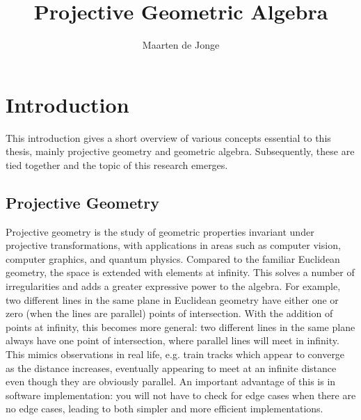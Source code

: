 \documentclass[a4paper, 10pt]{article}
\author{Maarten de Jonge}
\title{Projective Geometric Algebra}
\begin{document}
\newcommand{\rp}{$\mathbb{R}^{3,3}$ }

\maketitle

\section{Introduction}
This introduction gives a short overview of various concepts essential to
this thesis, mainly projective geometry and geometric algebra. Subsequently,
these are tied together and the topic of this research emerges.

\subsection{Projective Geometry}
Projective geometry is the study of geometric properties invariant under
projective transformations, with applications in areas such as computer vision,
computer graphics, and quantum physics. Compared to the familiar Euclidean
geometry, the space is extended with elements at infinity. This solves a number
of irregularities and adds a greater expressive power to the algebra. For
example, two different lines in the same plane in Euclidean geometry have either
one or zero (when the lines are parallel) points of intersection. With the
addition of points at infinity, this becomes more general: two different lines
in the same plane always have one point of intersection, where parallel lines
will meet in infinity. This mimics observations in real life, e.g. train tracks
which appear to converge as the distance increases, eventually
appearing to meet at an infinite distance even though they are obviously parallel.
An important advantage of this is in software implementation: you will not have
to check for edge cases when there are no edge cases, leading to both simpler
and more efficient implementations.
\end{document}
